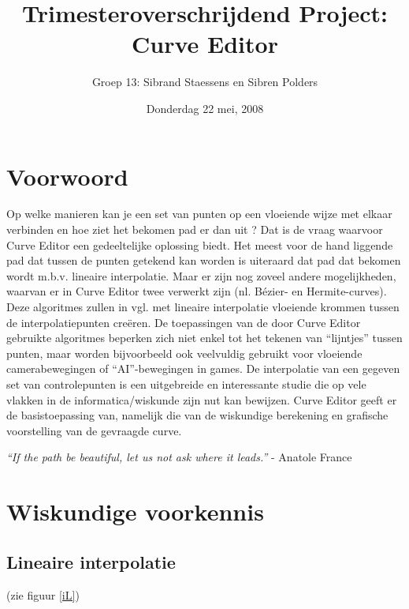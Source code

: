 \documentclass[a4paper,11pt,oneside, titlepage]{article}
\author{Groep 13: Sibrand Staessens en Sibren Polders}
\title{Trimesteroverschrijdend Project: Curve Editor}
\date{Donderdag 22 mei, 2008}
\begin{document}
\maketitle \newpage
\tableofcontents \newpage
\section{Voorwoord}
Op welke manieren kan je een set van punten op een vloeiende wijze met elkaar verbinden en hoe ziet het bekomen pad er dan uit ? Dat is
de vraag waarvoor Curve Editor een gedeeltelijke oplossing biedt. Het meest voor de hand liggende pad dat tussen de punten getekend kan worden 
is uiteraard dat pad dat bekomen wordt m.b.v. lineaire interpolatie. Maar er zijn nog zoveel andere mogelijkheden, waarvan er in Curve Editor twee verwerkt 
zijn (nl. Bézier- en Hermite-curves). Deze algoritmes zullen in vgl. met lineaire interpolatie vloeiende krommen
tussen de interpolatiepunten cre\"eren. De toepassingen van de door Curve Editor gebruikte algoritmes beperken zich niet enkel 
tot het tekenen van ``lijntjes'' tussen punten, maar worden bijvoorbeeld ook veelvuldig gebruikt voor vloeiende camerabewegingen of ``AI''-bewegingen in games.
De interpolatie van een gegeven set van controlepunten is een uitgebreide en interessante studie die 
op vele vlakken in de informatica/wiskunde zijn nut kan bewijzen. Curve Editor geeft er de 
basistoepassing van, namelijk die van de wiskundige berekening en grafische voorstelling van de gevraagde curve. \newline \newline \newline \newline
\newline \newline \newline \newline
\begin{center}
\textit{``If the path be beautiful, let us not ask where it leads.''} - Anatole France \newpage
\end{center}
\newpage
\section{Wiskundige voorkennis\label{swv}}
\subsection{Lineaire interpolatie \label{sli}}
(zie figuur \ref{iL})
\end{document}
